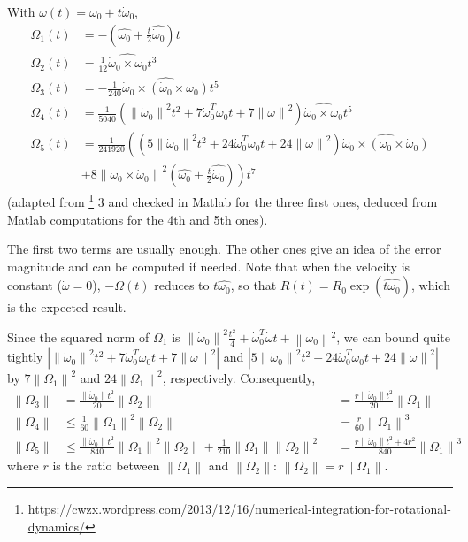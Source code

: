 \documentclass[]{article}
\newcommand{\norm}[1]{\left\| #1 \right\|}
\newcommand{\w}{\omega}
\newcommand{\dw}{\dot{\omega}}
\begin{document}
With $\w(t) = \w_0 + t \dot{\w}_0$, 
\begin{align}
	\Omega_1(t) & = -(\widehat{\w_0} + \frac{t}{2}\widehat{\dw_0})t \\
	\Omega_2(t) & = \frac{1}{12} \widehat{\dw_0 \times \w_0} t^3 \\
	\Omega_3(t) & = -\frac{1}{240} \widehat{\dw_0 \times (\dw_0 \times \w_0)}t^5 \\
	\Omega_4(t) & = \frac{1}{5040} (\norm{\dw_0}^2 t^2 + 7 \dw_0^T\w_0 t + 7 \norm{\w}^2) \widehat{\dw_0 \times \w_0}t^5 \\
	\Omega_5(t) & = \frac{1}{241920} \left((5\norm{\dw_0}^2 t^2 + 24\dw_0^T\w_0 t + 24\norm{\w}^2) \widehat{\dw_0 \times (\w_0 \times \dw_0)}\right. \\
	& \left.+ 8\norm{\w_0 \times \dw_0}^2 (\widehat{\w_0} + \frac{t}{2}\widehat{\dw_0})\right) t^7
\end{align}
(adapted from \footnote{\scriptsize \url{https://cwzx.wordpress.com/2013/12/16/numerical-integration-for-rotational-dynamics/}} 3 and checked in Matlab for the three first ones, deduced from Matlab computations for the 4th and 5th ones).

The first two terms are usually enough. The other ones give an idea of the error magnitude and can be computed if needed. Note that when the velocity is constant ($\dw = 0$), $-\Omega(t)$ reduces to $t \widehat{\w_0}$, so that $R(t) = R_0 \exp(\widehat{t\w_0})$, which is the expected result.

Since the squared norm of $\Omega_1$ is $\norm{\dw_0}^2 \frac{t^2}{4} + \dw_0^T \dw t + \norm{\w_0}^2$, we can bound quite tightly $\left|\norm{\dw_0}^2 t^2 + 7 \dw_0^T\w_0 t + 7 \norm{\w}^2 \right|$ and $\left|5\norm{\dw_0}^2 t^2 + 24\dw_0^T\w_0 t + 24\norm{\w}^2\right|$ by $7\norm{\Omega_1}^2$ and $24\norm{\Omega_1}^2$, respectively. Consequently,
\begin{align}
	\norm{\Omega_3} &= \frac{\norm{\dw_0} t^2}{20} \norm{\Omega_2} &&= \frac{r \norm{\dw_0} t^2}{20} \norm{\Omega_1}\\
	\norm{\Omega_4} &\leq \frac{1}{60} \norm{\Omega_1}^2\norm{\Omega_2} &&= \frac{r}{60} \norm{\Omega_1}^3\\
	\norm{\Omega_5} &\leq \frac{\norm{\dw_0} t^2}{840} \norm{\Omega_1}^2 \norm{\Omega_2} + \frac{1}{210} \norm{\Omega_1} \norm{\Omega_2}^2 &&= \frac{r \norm{\dw_0} t^2 + 4r^2}{840} \norm{\Omega_1}^3
\end{align}
where $r$ is the ratio between $\norm{\Omega_1}$ and $\norm{\Omega_2}$: $\norm{\Omega_2} = r \norm{\Omega_1}$.
\end{document}
